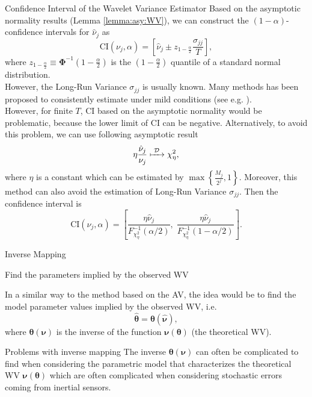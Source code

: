 \documentclass[envcountsect,usenames,dvipsnames]{beamer}
\theoremstyle{mystyle}
\begin{document}
\begin{frame}{Confidence Interval of the Wavelet Variance Estimator}
\footnotesize
Based on the asymptotic normality results (Lemma \ref{lemma:asy:WV}), we can construct the $(1-\alpha)$-confidence intervals for $\hat{\nu}_j$ as
%
\begin{equation*}
    \text{CI}\left(\nu_j, \alpha \right) = \left[ \hat{\nu}_j \pm z_{1- \frac{\alpha}{2}} \frac{\sigma_{jj}}{T} \right],
\end{equation*}
%
where $z_{1- \frac{\alpha}{2}} \equiv \bm{\Phi}^{-1}\left( 1- \frac{\alpha}{2} \right)$ is the $(1- \frac{\alpha}{2})$ quantile of a standard normal distribution.\\
However, the Long-Run Variance $\sigma_{jj}$ is usually known. Many methods has been proposed to consistently estimate under mild conditions (see e.g. \cite{newey1986simple}).\\

However, for finite $T$, CI based on the asymptotic normality would be problematic, because the lower limit of CI can be negative. Alternatively, to avoid this problem, we can use following asymptotic result
%
\begin{equation*}
    \eta \frac{\hat{\nu}_j}{\nu_j} \xmapsto[\;\;\;\;\; ]{\mathcal{D}} \chi^2_{\eta},
\end{equation*}
%
where $\eta$ is a constant which can be estimated by $\max\left\{\frac{M_j}{2^j}, 1\right\}$. Moreover, this method can also avoid the estimation of Long-Run Variance $\sigma_{jj}$.
Then the confidence interval is 
%
\begin{equation*}
    \text{CI}\left(\nu_j, \alpha\right) = \left[ \frac{\eta\hat{\nu}_j}{F^{-1}_{\chi^2_{\eta}}(\alpha/2)}, \; \frac{\eta\hat{\nu}_j}{F^{-1}_{\chi^2_{\eta}}(1-\alpha/2)} \right].
\end{equation*}
%
\end{frame}

\begin{frame}{Inverse Mapping}

\begin{block}{Find the parameters implied by the observed WV}

In a similar way to the method based on the AV, the idea would be to find the model parameter values implied by the observed WV, i.e.
%
\begin{equation*}
    \hat{\bm{\theta}} = \bm{\theta}(\hat{\bm{\nu}}) ,
\end{equation*}
%
where $\bm{\theta}(\bm{\nu})$ is the inverse of the function $\bm{\nu}(\bm{\theta})$ (the theoretical WV).
\end{block}

\begin{alertblock}{Problems with inverse mapping}
The inverse $\bm{\theta}(\bm{\nu})$ can often be complicated to find when considering the parametric model that characterizes the theoretical WV $\bm{\nu}(\bm{\theta})$ which are often complicated when considering stochastic errors coming from inertial sensors.
\end{alertblock}
    
\end{frame}
\end{document}
